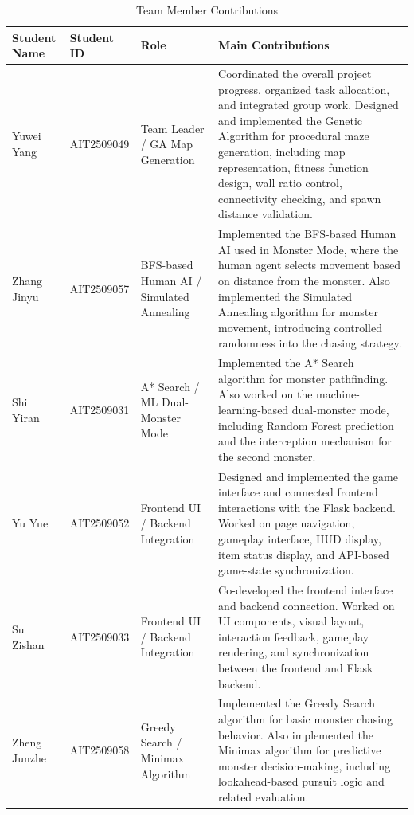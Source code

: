 \documentclass[12pt,a4paper]{article}
\begin{document}
\begin{table}[H]
\centering
\caption{Team Member Contributions}
\renewcommand{\arraystretch}{1.25}
\begin{tabular}{p{2.8cm} p{2.6cm} p{3.2cm} p{6.2cm}}
\toprule
\textbf{Student Name} & \textbf{Student ID} & \textbf{Role} & \textbf{Main Contributions} \\
\midrule

Yuwei Yang &
AIT2509049 &
Team Leader / GA Map Generation &
Coordinated the overall project progress, organized task allocation, and integrated group work. Designed and implemented the Genetic Algorithm for procedural maze generation, including map representation, fitness function design, wall ratio control, connectivity checking, and spawn distance validation. \\

Zhang Jinyu &
AIT2509057 &
BFS-based Human AI / Simulated Annealing &
Implemented the BFS-based Human AI used in Monster Mode, where the human agent selects movement based on distance from the monster. Also implemented the Simulated Annealing algorithm for monster movement, introducing controlled randomness into the chasing strategy. \\

Shi Yiran &
AIT2509031 &
A* Search / ML Dual-Monster Mode &
Implemented the A* Search algorithm for monster pathfinding. Also worked on the machine-learning-based dual-monster mode, including Random Forest prediction and the interception mechanism for the second monster. \\

Yu Yue &
AIT2509052 &
Frontend UI / Backend Integration &
Designed and implemented the game interface and connected frontend interactions with the Flask backend. Worked on page navigation, gameplay interface, HUD display, item status display, and API-based game-state synchronization. \\

Su Zishan &
AIT2509033 &
Frontend UI / Backend Integration &
Co-developed the frontend interface and backend connection. Worked on UI components, visual layout, interaction feedback, gameplay rendering, and synchronization between the frontend and Flask backend. \\

Zheng Junzhe &
AIT2509058 &
Greedy Search / Minimax Algorithm &
Implemented the Greedy Search algorithm for basic monster chasing behavior. Also implemented the Minimax algorithm for predictive monster decision-making, including lookahead-based pursuit logic and related evaluation. \\

\bottomrule
\end{tabular}
\label{tab:team_contributions}
\end{table}
\end{document}
